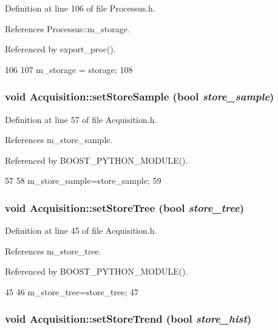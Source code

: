 Definition at line 106 of file Processus.h.

References Processus::m\_\-storage.

Referenced by export\_\-proc().


\begin{DoxyCode}
106                                       {
107     m_storage = storage;
108   }
\end{DoxyCode}
\hypertarget{classAcquisition_af36a1b660244096b7d274f591f67b695}{
\subsubsection[{setStoreSample}]{\setlength{\rightskip}{0pt plus 5cm}void Acquisition::setStoreSample (bool {\em store\_\-sample})}}
\label{classAcquisition_af36a1b660244096b7d274f591f67b695}


Definition at line 57 of file Acquisition.h.

References m\_\-store\_\-sample.

Referenced by BOOST\_\-PYTHON\_\-MODULE().


\begin{DoxyCode}
57                                         {
58     m_store_sample=store_sample;
59   }
\end{DoxyCode}
\hypertarget{classAcquisition_a759193856d26354722e5f647e60e16de}{
\subsubsection[{setStoreTree}]{\setlength{\rightskip}{0pt plus 5cm}void Acquisition::setStoreTree (bool {\em store\_\-tree})}}
\label{classAcquisition_a759193856d26354722e5f647e60e16de}


Definition at line 45 of file Acquisition.h.

References m\_\-store\_\-tree.

Referenced by BOOST\_\-PYTHON\_\-MODULE().


\begin{DoxyCode}
45                                     {
46     m_store_tree=store_tree;
47   }
\end{DoxyCode}
\hypertarget{classAcquisition_a1ceff272a1ad030dcd20c0dcddc65443}{
\subsubsection[{setStoreTrend}]{\setlength{\rightskip}{0pt plus 5cm}void Acquisition::setStoreTrend (bool {\em store\_\-hist})}}
\label{classAcquisition_a1ceff272a1ad030dcd20c0dcddc65443}


